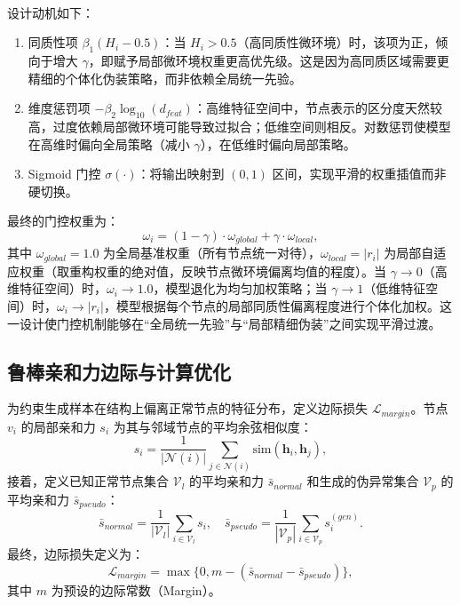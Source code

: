 ﻿﻿﻿﻿    \documentclass[conference, onecolumn]{IEEEtran}
\begin{document}
    \noindent 设计动机如下：
    \begin{enumerate}
        \item 同质性项 $\beta_1(H_i - 0.5)$：当 $H_i > 0.5$（高同质性微环境）时，该项为正，倾向于增大 $\gamma$，即赋予局部微环境权重更高优先级。这是因为高同质区域需要更精细的个体化伪装策略，而非依赖全局统一先验。
        
        \item 维度惩罚项 $-\beta_2 \log_{10}(d_{feat})$：高维特征空间中，节点表示的区分度天然较高，过度依赖局部微环境可能导致过拟合；低维空间则相反。对数惩罚使模型在高维时偏向全局策略（减小 $\gamma$），在低维时偏向局部策略。
        
        \item Sigmoid 门控 $\sigma(\cdot)$：将输出映射到 $(0, 1)$ 区间，实现平滑的权重插值而非硬切换。
    \end{enumerate}

    最终的门控权重为：
    \begin{equation}
    \omega_i = (1 - \gamma) \cdot \omega_{global} + \gamma \cdot \omega_{local},
    \end{equation}
    其中 $\omega_{global} = 1.0$ 为全局基准权重（所有节点统一对待），$\omega_{local} = |r_i|$ 为局部自适应权重（取重构权重的绝对值，反映节点微环境偏离均值的程度）。当 $\gamma \to 0$（高维特征空间）时，$\omega_i \to 1.0$，模型退化为均匀加权策略；当 $\gamma \to 1$（低维特征空间）时，$\omega_i \to |r_i|$，模型根据每个节点的局部同质性偏离程度进行个体化加权。这一设计使门控机制能够在“全局统一先验”与“局部精细伪装”之间实现平滑过渡。

    \subsection{鲁棒亲和力边际与计算优化}
    为约束生成样本在结构上偏离正常节点的特征分布，定义边际损失 $\mathcal{L}_{margin}$。节点 $v_i$ 的局部亲和力 $s_i$ 为其与邻域节点的平均余弦相似度：
    \begin{equation}
    s_i = \frac{1}{|\mathcal{N}(i)|} \sum_{j \in \mathcal{N}(i)} \text{sim}(\mathbf{h}_i, \mathbf{h}_j),
    \end{equation}
    接着，定义已知正常节点集合 $\mathcal{V}_l$ 的平均亲和力 $\bar{s}_{normal}$ 和生成的伪异常集合 $\mathcal{V}_p$ 的平均亲和力 $\bar{s}_{pseudo}$：
    \begin{equation}
    \bar{s}_{normal} = \frac{1}{|\mathcal{V}_l|} \sum_{i \in \mathcal{V}_l} s_i, \quad \bar{s}_{pseudo} = \frac{1}{|\mathcal{V}_p|} \sum_{i \in \mathcal{V}_p} s_i^{(gen)}.
    \end{equation}
    最终，边际损失定义为：
    \begin{equation}
    \mathcal{L}_{margin} = \max\{0, m - (\bar{s}_{normal} - \bar{s}_{pseudo})\},
    \end{equation}
    其中 $m$ 为预设的边际常数（Margin）。
\end{document}
